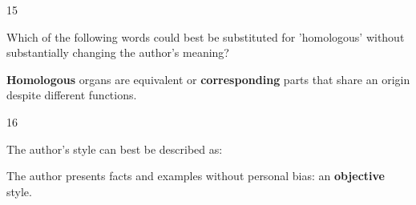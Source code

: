 \begin{question}{15}
{Which of the following words could best be substituted for 'homologous' without substantially changing the author's meaning?\par}
\begin{explain}
\textbf{Homologous} organs are equivalent or \textbf{corresponding} parts that share an origin despite different functions.
\end{explain}
\end{question}

\begin{question}{16}
{The author's style can best be described as:\par}
\begin{explain}
The author presents facts and examples without personal bias: an \textbf{objective} style.
\end{explain}
\end{question}

